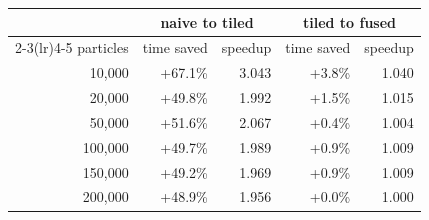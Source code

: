 \begin{tabular}{r rr rr}
\toprule
& \multicolumn{2}{c}{naive to tiled} & \multicolumn{2}{c}{tiled to fused} \\
\cmidrule(lr){2-3}\cmidrule(lr){4-5}
particles & time saved & speedup & time saved & speedup \\
\midrule
10,000 & +67.1\% & 3.043 & +3.8\% & 1.040 \\
20,000 & +49.8\% & 1.992 & +1.5\% & 1.015 \\
50,000 & +51.6\% & 2.067 & +0.4\% & 1.004 \\
100,000 & +49.7\% & 1.989 & +0.9\% & 1.009 \\
150,000 & +49.2\% & 1.969 & +0.9\% & 1.009 \\
200,000 & +48.9\% & 1.956 & +0.0\% & 1.000 \\
\bottomrule
\end{tabular}
